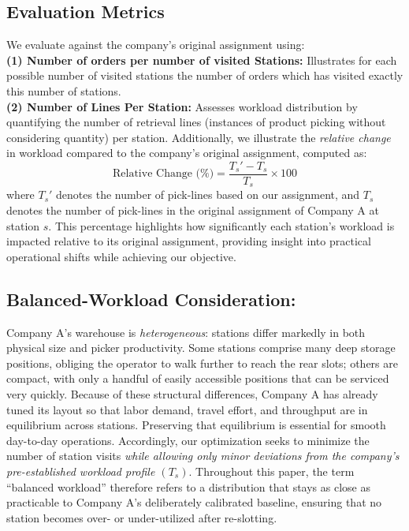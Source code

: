 \documentclass[11pt]{elsarticle}
\begin{document}
\subsection{Evaluation Metrics}

We evaluate against the company’s original assignment using: \\
\textbf{(1) Number of orders per number of visited Stations:} Illustrates for each possible number of visited stations the number of orders which has visited exactly this number of stations. \\
\textbf{(2) Number of Lines Per Station:} 
Assesses workload distribution by quantifying the number of retrieval lines (instances of product picking without considering quantity) per station. Additionally, we illustrate the \textit{relative change} in workload compared to the company's original assignment, computed as:
\begin{equation*}
        \text{Relative Change (\%)} = \frac{T_s' - T_s}{T_s} \times 100
\end{equation*}
where $T_s'$ denotes the number of pick-lines based on our assignment, and $T_s$ denotes the number of pick-lines in the original assignment of Company A at station $s$. 
This percentage highlights how significantly each station’s workload is impacted relative to its original assignment, providing insight into practical operational shifts while achieving our objective.
\subsection{Balanced-Workload Consideration: }\label{par:balanced_workload} Company A’s warehouse is \emph{heterogeneous}: stations differ markedly in both physical size and picker productivity. Some stations comprise many deep storage positions, obliging the operator to walk further to reach the rear slots; others are compact, with only a handful of easily accessible positions that can be serviced very quickly. Because of these structural differences, Company A has already tuned its layout so that labor demand, travel effort, and throughput are in equilibrium across stations. Preserving that equilibrium is essential for smooth day-to-day operations. Accordingly, our optimization seeks to minimize the number of station visits \emph{while allowing only minor deviations from the company’s pre-established workload profile $(T_s)$}. Throughout this paper, the term “balanced workload” therefore refers to a distribution that stays as close as practicable to Company A’s deliberately calibrated baseline, ensuring that no station becomes over- or under-utilized after re-slotting.
\end{document}
